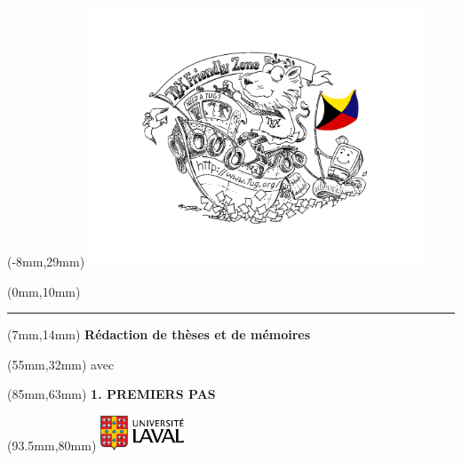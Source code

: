 
\begin{textblock*}{100mm}(-8mm,29mm)
  \includegraphics[width=100mm,keepaspectratio]{TeXFZoneColor}
\end{textblock*}

\begin{textblock*}{107mm}(0mm,10mm)
  \rule[0mm]{107mm}{13mm}
\end{textblock*}

\begin{textblock*}{98mm}(7mm,14mm)
  \color{white}
  \fontsize{17pt}{18pt}\selectfont\bfseries%
  Rédaction de thèses et de mémoires
\end{textblock*}

\begin{textblock*}{70mm}(55mm,32mm)
  \color{black}
  \fontsize{17pt}{18pt}\selectfont%
  avec\;\;
  \fontsize{60pt}{60pt}\selectfont%
  \raisebox{-1.07ex}{\LaTeX}
\end{textblock*}

\begin{textblock*}{30mm}(85mm,63mm)
  \small\bfseries%
  1. PREMIERS PAS
\end{textblock*}

\begin{textblock*}{25mm}(93.5mm,80mm)
  \includegraphics[width=25mm,keepaspectratio]{ul_p}
\end{textblock*}
